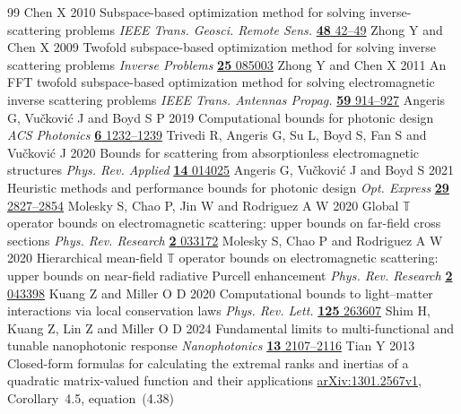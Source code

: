 \begin{thebibliography}{99}
\setlength{\itemsep}{2pt plus 0.5pt minus 0.2pt}
 Chen X 2010 Subspace-based optimization method for solving inverse-scattering problems \emph{IEEE Trans. Geosci. Remote Sens.} \href{https://doi.org/10.1109/TGRS.2009.2025122}{\textbf{48} 42--49}
 Zhong Y and Chen X 2009 Twofold subspace-based optimization method for solving inverse scattering problems \emph{Inverse Problems} \href{https://doi.org/10.1088/0266-5611/25/8/085003}{\textbf{25} 085003}
 Zhong Y and Chen X 2011 An FFT twofold subspace-based optimization method for solving electromagnetic inverse scattering problems \emph{IEEE Trans. Antennas Propag.} \href{https://doi.org/10.1109/TAP.2010.2103027}{\textbf{59} 914--927}
 Angeris G, Vu\v{c}kovi\'{c} J and Boyd S P 2019 Computational bounds for photonic design \emph{ACS Photonics} \href{https://doi.org/10.1021/acsphotonics.9b00154}{\textbf{6} 1232--1239}
 Trivedi R, Angeris G, Su L, Boyd S, Fan S and Vu\v{c}kovi\'{c} J 2020 Bounds for scattering from absorptionless electromagnetic structures \emph{Phys. Rev. Applied} \href{https://doi.org/10.1103/PhysRevApplied.14.014025}{\textbf{14} 014025}
 Angeris G, Vu\v{c}kovi\'{c} J and Boyd S 2021 Heuristic methods and performance bounds for photonic design \emph{Opt. Express} \href{https://doi.org/10.1364/OE.415052}{\textbf{29} 2827--2854}
 Molesky S, Chao P, Jin W and Rodriguez A W 2020 Global $\mathbb{T}$ operator bounds on electromagnetic scattering: upper bounds on far-field cross sections \emph{Phys. Rev. Research} \href{https://doi.org/10.1103/PhysRevResearch.2.033172}{\textbf{2} 033172}
 Molesky S, Chao P and Rodriguez A W 2020 Hierarchical mean-field $\mathbb{T}$ operator bounds on electromagnetic scattering: upper bounds on near-field radiative Purcell enhancement \emph{Phys. Rev. Research} \href{https://doi.org/10.1103/PhysRevResearch.2.043398}{\textbf{2} 043398}
 Kuang Z and Miller O D 2020 Computational bounds to light--matter interactions via local conservation laws \emph{Phys. Rev. Lett.} \href{https://doi.org/10.1103/PhysRevLett.125.263607}{\textbf{125} 263607}
 Shim H, Kuang Z, Lin Z and Miller O D 2024 Fundamental limits to multi-functional and tunable nanophotonic response \emph{Nanophotonics} \href{https://doi.org/10.1515/nanoph-2023-0630}{\textbf{13} 2107--2116}
 Tian Y 2013 Closed-form formulas for calculating the extremal ranks and inertias of a quadratic matrix-valued function and their applications \href{https://arxiv.org/abs/1301.2567v1}{arXiv:1301.2567v1}, Corollary~4.5, equation~(4.38)

\end{thebibliography}
